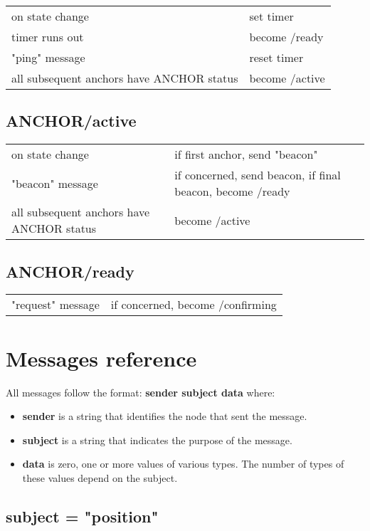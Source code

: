 \documentclass[12pt,a4paper,fleqn]{report}
\begin{document}
\begin{appendices}
\begin{tabular}{p{5cm}p{10cm}}
	on state change		& set timer \\
	timer runs out		& become /ready \\
	"ping" message		& reset timer \\
	all subsequent anchors have ANCHOR status & become /active
\end{tabular}

\subsection*{ANCHOR/active}

\begin{tabular}{p{5cm}p{10cm}}
	on state change		& if first anchor, send "beacon" \\
	"beacon" message	& if concerned, send beacon, if final beacon, become /ready \\
	all subsequent anchors have ANCHOR status & become /active
\end{tabular}

\subsection*{ANCHOR/ready}

\begin{tabular}{p{5cm}p{10cm}}
	"request" message	& if concerned, become /confirming \\
\end{tabular}

\section*{Messages reference}

All messages follow the format: \textbf{sender subject data} where:
\begin{itemize}
	\itemsep0em
	\item \textbf{sender} is a string that identifies the node that sent the message.
	\item \textbf{subject} is a string that indicates the purpose of the message.
	\item \textbf{data} is zero, one or more values of various types. The number of types of these values depend on the subject.
\end{itemize}

\subsection*{subject = "position"}


\end{appendices}
\end{document}
